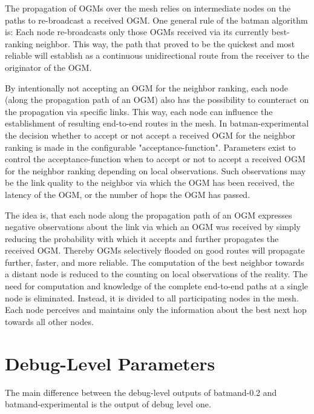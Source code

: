 \documentclass[11pt]{article}
\begin{document}
The propagation of OGMs over the mesh relies on intermediate nodes on the paths to re-broadcast a received OGM.
%
One general rule of the batman algorithm is: 
Each node re-broadcasts only those OGMs received via its currently best-ranking neighbor. 
%
%
%
This way, the path that proved to be the quickest and most reliable will establish as a continuous unidirectional route from the receiver to the originator of the OGM.


%
By intentionally not accepting an OGM for the neighbor ranking, each node (along the propagation path of an OGM) also has the possibility to counteract on the propagation via specific links. 
This way, each node can influence the establishment of resulting end-to-end routes in the mesh.
%
In batman-experimental the decision whether to accept or not accept a received OGM for the neighbor ranking is made in the configurable "acceptance-function".
%
Parameters exist to control the acceptance-function when to accept or not to accept a received OGM for the neighbor ranking depending on local observations. 
%
Such observations may be the link quality to the neighbor via which the OGM has been received, the latency of the OGM, or the number of hops the OGM has passed.

The idea is, that each node along the propagation path of an OGM expresses negative observations about the link via which an OGM was received by simply reducing the probability with which it accepts and further propagates the received OGM.
%
Thereby OGMs selectively flooded on good routes will propagate further, faster, and more reliable.
%
The computation of the best neighbor towards a distant node is reduced to the counting on local observations of the reality.
%
The need for computation and knowledge of the complete end-to-end paths at a single node is eliminated.
%
Instead, it is divided to all participating nodes in the mesh. Each node perceives and maintains only the information about the best next hop towards all other nodes.




\section{Debug-Level Parameters}
\label{sec:debug-levels}
The main difference between the debug-level outputs of batmand-0.2 and batmand-experimental is the output of debug level one.
\end{document}
